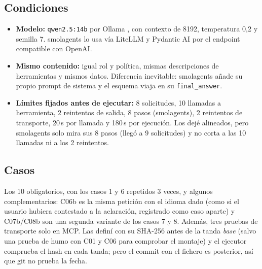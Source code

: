\documentclass[10pt,a4paper]{article}
\newcommand{\cod}[1]{\texttt{\small #1}}
\begin{document}
\subsection{Condiciones}
\begin{itemize}
\item \textbf{Modelo:} \cod{qwen2.5:14b} por Ollama \cite{ollama}, con contexto de 8192, temperatura 0,2 y semilla 7. smolagents lo usa vía LiteLLM y Pydantic AI por el endpoint compatible con OpenAI.
\item \textbf{Mismo contenido:} igual rol y política, mismas descripciones de herramientas y mismos datos. Diferencia inevitable: smolagents añade su propio prompt de sistema y el esquema viaja en su \cod{final\_answer}.
\item \textbf{Límites fijados antes de ejecutar:} 8 solicitudes, 10 llamadas a herramienta, 2 reintentos de salida, 8 pasos (smolagents), 2 reintentos de transporte, 20\,s por llamada y 180\,s por ejecución. Los dejé alineados, pero smolagents solo mira sus 8 pasos (llegó a 9 solicitudes) y no corta a las 10 llamadas ni a los 2 reintentos.
\end{itemize}

\subsection{Casos}
Los 10 obligatorios, con los casos 1 y 6 repetidos 3 veces, y algunos complementarios: C06b es la misma petición con el idioma dado (como si el usuario hubiera contestado a la aclaración, registrado como caso aparte) y C07b/C08b son una segunda variante de los casos 7 y 8. Además, tres pruebas de transporte solo en MCP.
Las definí con su SHA-256 antes de la tanda \emph{base} (salvo una prueba de humo con C01 y C06 para comprobar el montaje) y el ejecutor comprueba el hash en cada tanda; pero el commit con el fichero es posterior, así que git no prueba la fecha.
\end{document}
